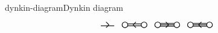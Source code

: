 \begin{topic}{dynkin-diagram}{Dynkin diagram}
\[\begin{tikzcd}[column sep=0em, row sep=0em]
\begin{tikzpicture}[scale=.4]
                \draw[thick] (0.3cm,-0.1cm) -- +(1.4 cm,0cm);
                \draw[thick] (0.85cm,0.3cm) -- +(0.3cm,-0.3cm);
                \draw[thick] (0.85cm,-0.3cm) -- +(0.3cm,0.3cm);
            \end{tikzpicture} & \begin{tikzpicture}[scale=.4]
                \draw[thick] (0cm,0) circle (.3cm);
                \draw[thick] (2cm,0) circle (.3cm);
                \draw[thick] (0.3cm,0.1cm) -- +(1.4 cm,0cm);
                \draw[thick] (0.3cm,-0.1cm) -- +(1.4 cm,0cm);
                \draw[thick] (1.15cm,0.3cm) -- +(-0.3cm,-0.3cm);
                \draw[thick] (1.15cm,-0.3cm) -- +(-0.3cm,0.3cm);
            \end{tikzpicture} & \begin{tikzpicture}[scale=.4]
                \draw[thick] (0cm,0) circle (.3cm);
                \draw[thick] (2cm,0) circle (.3cm);
                \draw[thick] (0.3cm,0.15cm) -- +(1.4 cm,0cm);
                \draw[thick] (0.3cm,0cm) -- +(1.4 cm,0cm);
                \draw[thick] (0.3cm,-0.15cm) -- +(1.4 cm,0cm);
                \draw[thick] (0.85cm,0.3cm) -- +(0.3cm,-0.3cm);
                \draw[thick] (0.85cm,-0.3cm) -- +(0.3cm,0.3cm);
            \end{tikzpicture} & \begin{tikzpicture}[scale=.4]
                \draw[thick] (0cm,0) circle (.3cm);
                \draw[thick] (2cm,0) circle (.3cm);
                \draw[thick] (0.3cm,0.15cm) -- +(1.4 cm,0cm);
                \draw[thick] (0.3cm,0cm) -- +(1.4 cm,0cm);
                \draw[thick] (0.3cm,-0.15cm) -- +(1.4 cm,0cm);
                \draw[thick] (1.15cm,0.3cm) -- +(-0.3cm,-0.3cm);
                \draw[thick] (1.15cm,-0.3cm) -- +(-0.3cm,0.3cm);
            \end{tikzpicture}
    \end{tikzcd} \]
\end{topic}

